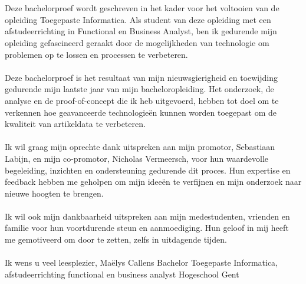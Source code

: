 
\chapter*{}%
\label{ch:voorwoord}


Deze bachelorproef wordt geschreven in het kader voor het voltooien van de opleiding Toegepaste Informatica. Als student van deze opleiding met een afstudeerrichting in Functional en Business Analyst, ben ik gedurende mijn opleiding gefascineerd geraakt door de mogelijkheden van technologie om problemen op te lossen en processen te verbeteren.
\\ \\
Deze bachelorproef is het resultaat van mijn nieuwsgierigheid en toewijding gedurende mijn laatste jaar van mijn bacheloropleiding. Het onderzoek, de analyse en de proof-of-concept die ik heb uitgevoerd, hebben tot doel om te verkennen hoe geavanceerde technologieën kunnen worden toegepast om de kwaliteit van artikeldata te verbeteren.
\\ \\
Ik wil graag mijn oprechte dank uitspreken aan mijn promotor, Sebastiaan Labijn, en mijn co-promotor, Nicholas Vermeersch, voor hun waardevolle begeleiding, inzichten en ondersteuning gedurende dit proces. Hun expertise en feedback hebben me geholpen om mijn ideeën te verfijnen en mijn onderzoek naar nieuwe hoogten te brengen.
\\ \\
Ik wil ook mijn dankbaarheid uitspreken aan mijn medestudenten, vrienden en familie voor hun voortdurende steun en aanmoediging. Hun geloof in mij heeft me gemotiveerd om door te zetten, zelfs in uitdagende tijden.
\\ \\ %
Ik wens u veel leesplezier,
\newline Maëlys Callens
\newline Bachelor Toegepaste Informatica, afstudeerrichting functional en business analyst
\newline Hogeschool Gent
